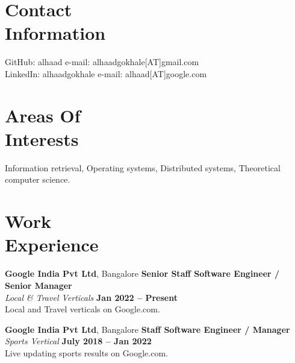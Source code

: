 \documentclass[margin,line]{resume}
\begin{document}
\begin{resume}

    \section{\mysidestyle Contact\\Information}

    GitHub: alhaad                            \hfill e-mail: alhaadgokhale[AT]gmail.com          \vspace{0mm}\\\vspace{0mm}%
    LinkedIn: alhaadgokhale                   \hfill e-mail: alhaad[AT]google.com  \vspace{0mm}\\\vspace{-4.5mm}%


    \section{\mysidestyle Areas Of\\Interests}

    Information retrieval, Operating systems, Distributed systems, Theoretical computer science.

    \section{\mysidestyle Work\\Experience}

    \textbf{Google India Pvt Ltd}, Bangalore \hfill \textbf{Senior Staff Software Engineer / Senior Manager} \vspace{2mm}\\\vspace{1mm}%
    \textsl{Local \& Travel Verticals} \hfill \textbf{Jan 2022 -- Present}\\
    Local and Travel verticals on Google.com.

    \textbf{Google India Pvt Ltd}, Bangalore \hfill \textbf{Staff Software Engineer / Manager} \vspace{2mm}\\\vspace{1mm}%
    \textsl{Sports Vertical} \hfill \textbf{July 2018 -- Jan 2022}\\
    Live updating sports results on Google.com.
 

\end{resume}
\end{document}
